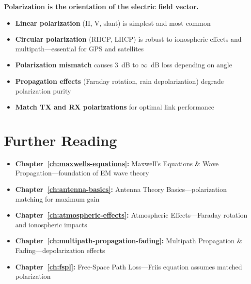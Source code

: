 \vspace{1em}

\begin{keyconcept}
\textbf{Polarization is the orientation of the electric field vector.}
\begin{itemize}
\item \textbf{Linear polarization} (H, V, slant) is simplest and most common
\item \textbf{Circular polarization} (RHCP, LHCP) is robust to ionospheric effects and multipath---essential for GPS and satellites
\item \textbf{Polarization mismatch} causes 3~dB to $\infty$~dB loss depending on angle
\item \textbf{Propagation effects} (Faraday rotation, rain depolarization) degrade polarization purity
\item \textbf{Match TX and RX polarizations} for optimal link performance
\end{itemize}
\end{keyconcept}

\section{Further Reading}

\begin{itemize}
\item \textbf{Chapter~\ref{ch:maxwells-equations}:} Maxwell's Equations \& Wave Propagation---foundation of EM wave theory
\item \textbf{Chapter~\ref{ch:antenna-basics}:} Antenna Theory Basics---polarization matching for maximum gain
\item \textbf{Chapter~\ref{ch:atmospheric-effects}:} Atmospheric Effects---Faraday rotation and ionospheric impacts
\item \textbf{Chapter~\ref{ch:multipath-propagation-fading}:} Multipath Propagation \& Fading---depolarization effects
\item \textbf{Chapter~\ref{ch:fspl}:} Free-Space Path Loss---Friis equation assumes matched polarization
\end{itemize}
